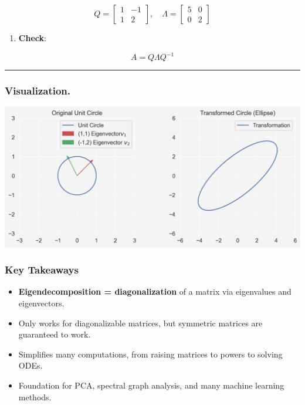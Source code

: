 \documentclass[
  letterpaper,
  DIV=11,
  numbers=noendperiod]{scrartcl}
\providecommand{\tightlist}{%
  \setlength{\itemsep}{0pt}\setlength{\parskip}{0pt}}\usepackage{longtable,booktabs,array}
\begin{document}
\[
Q = \begin{bmatrix} 1 & -1 \\ 1 & 2 \end{bmatrix}, \quad
\Lambda = \begin{bmatrix} 5 & 0 \\ 0 & 2 \end{bmatrix}
\]

\begin{enumerate}
\def\labelenumi{\arabic{enumi}.}
\setcounter{enumi}{3}
\tightlist
\item
  \textbf{Check}:
\end{enumerate}

\[
A = Q \Lambda Q^{-1}
\]

\begin{center}\rule{0.5\linewidth}{0.5pt}\end{center}

\subsubsection{Visualization.}\label{visualization.}

\begin{center}
\includegraphics{index_files/figure-pdf/cell-2-output-1.png}
\end{center}

\subsubsection{Key Takeaways}\label{key-takeaways}

\begin{itemize}
\tightlist
\item
  \textbf{Eigendecomposition = diagonalization} of a matrix via
  eigenvalues and eigenvectors.
\item
  Only works for diagonalizable matrices, but symmetric matrices are
  guaranteed to work.
\item
  Simplifies many computations, from raising matrices to powers to
  solving ODEs.
\item
  Foundation for PCA, spectral graph analysis, and many machine learning
  methods.
\end{itemize}
\end{document}
